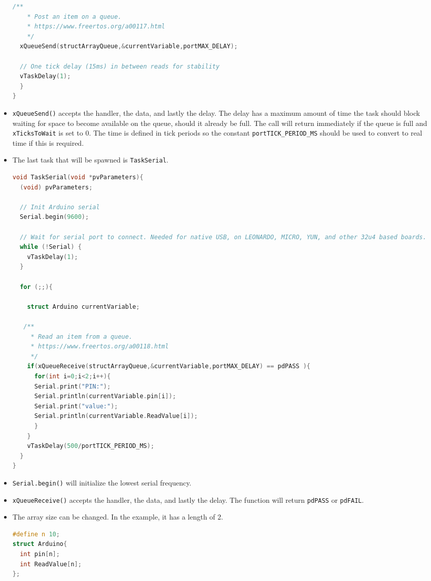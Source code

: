 \documentclass{article}
\begin{document}
\begin{itemize}
\begin{lstlisting}[language=C++,basicstyle=\ttfamily\footnotesize]
  /**
    * Post an item on a queue.
    * https://www.freertos.org/a00117.html
    */
  xQueueSend(structArrayQueue,&currentVariable,portMAX_DELAY);

  // One tick delay (15ms) in between reads for stability
  vTaskDelay(1);
  }
}
\end{lstlisting}

    \item \texttt{xQueueSend()} accepts the handler, the data, and lastly the delay. The delay has a maximum amount of time the task should block waiting for space to become available on the queue, should it already be full. The call will return immediately if the queue is full and \texttt{xTicksToWait} is set to 0. The time is defined in tick periods so the constant \texttt{portTICK\_PERIOD\_MS} should be used to convert to real time if this is required. 

    \item The last task that will be spawned is \texttt{TaskSerial}.
\begin{lstlisting}[language=C++,basicstyle=\ttfamily\footnotesize]
void TaskSerial(void *pvParameters){
  (void) pvParameters;

  // Init Arduino serial
  Serial.begin(9600);

  // Wait for serial port to connect. Needed for native USB, on LEONARDO, MICRO, YUN, and other 32u4 based boards.
  while (!Serial) {
    vTaskDelay(1);
  }
  
  for (;;){
    
    struct Arduino currentVariable;

   /**
     * Read an item from a queue.
     * https://www.freertos.org/a00118.html
     */
    if(xQueueReceive(structArrayQueue,&currentVariable,portMAX_DELAY) == pdPASS ){
      for(int i=0;i<2;i++){
      Serial.print("PIN:");
      Serial.println(currentVariable.pin[i]);
      Serial.print("value:");
      Serial.println(currentVariable.ReadValue[i]);
      }
    }
    vTaskDelay(500/portTICK_PERIOD_MS);
  }
}
\end{lstlisting}

    \item \texttt{Serial.begin()} will initialize the lowest serial frequency.
    \item \texttt{xQueueReceive()} accepts the handler, the data, and lastly the delay. The function will return \texttt{pdPASS} or \texttt{pdFAIL}.

    \item The array size can be changed. In the example, it has a length of 2.
\begin{lstlisting}[language=C++,basicstyle=\ttfamily\footnotesize]
#define n 10;
struct Arduino{
  int pin[n];
  int ReadValue[n];
};
\end{lstlisting}


\end{itemize}
\end{document}
